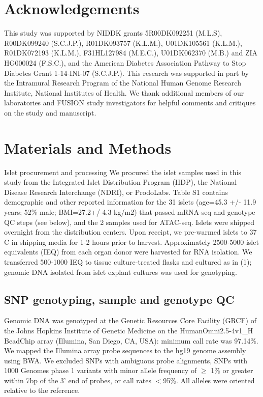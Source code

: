 \section{Acknowledgements}
This study was supported by NIDDK grants 5R00DK092251 (M.L.S), R00DK099240 (S.C.J.P.), R01DK093757 (K.L.M.), U01DK105561 (K.L.M.), R01DK072193 (K.L.M.), F31HL127984 (M.E.C.), U01DK062370 (M.B.) and ZIA HG000024 (F.S.C.), and the American Diabetes Association Pathway to Stop Diabetes Grant 1-14-INI-07 (S.C.J.P.). This research was supported in part by the Intramural Research Program of the National Human Genome Research Institute, National Institutes of Health. We thank additional members of our laboratories and FUSION study investigators for helpful comments and critiques on the study and manuscript.


\section{Materials and Methods}
Islet procurement and processing 
We procured the islet samples used in this study from the Integrated Islet Distribution Program (IIDP), the National Disease Research Interchange (NDRI), or ProdoLabs.  Table S1 contains demographic and other reported information for the 31 islets (age=45.3 +/- 11.9 years; 52\% male; BMI=27.2+/-4.3 kg/m2) that passed mRNA-seq and genotype QC steps (see below), and the 2 samples used for ATAC-seq. Islets were shipped overnight from the distribution centers.  Upon receipt, we pre-warmed islets to 37 C in shipping media for 1-2 hours prior to harvest.  Approximately 2500-5000 islet equivalents (IEQ) from each organ donor were harvested for RNA isolation. We transferred 500-1000 IEQ to tissue culture-treated flasks and cultured as in (1); genomic DNA isolated from islet explant cultures was used for genotyping.

\subsection{SNP genotyping, sample and genotype QC} 
Genomic DNA was genotyped at the Genetic Resources Core Facility (GRCF) of the Johns Hopkins Institute of Genetic Medicine on the HumanOmni2.5-4v1\_H BeadChip array (Illumina, San Diego, CA, USA): minimum call rate was 97.14\%. We mapped the Illumina array probe sequences to the hg19 genome assembly using BWA. We excluded SNPs with ambiguous probe alignments, SNPs with 1000 Genomes phase 1 variants with minor allele frequency of $\geq$ 1\% or greater within 7bp of the 3' end of probes, or call rates $<$95\%. All alleles were oriented relative to the reference. 

